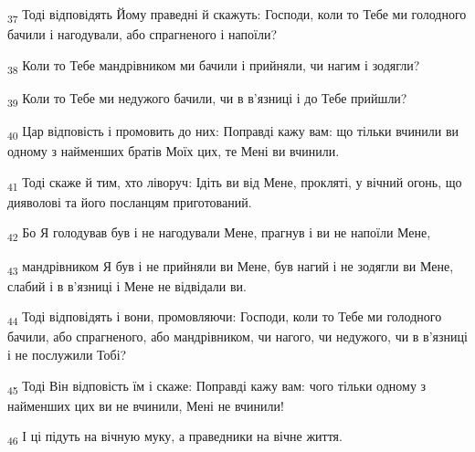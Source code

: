 \begin{tcolorbox}
\textsubscript{37} Тоді відповідять Йому праведні й скажуть: Господи, коли то Тебе ми голодного бачили і нагодували, або спрагненого і напоїли?
\end{tcolorbox}
\begin{tcolorbox}
\textsubscript{38} Коли то Тебе мандрівником ми бачили і прийняли, чи нагим і зодягли?
\end{tcolorbox}
\begin{tcolorbox}
\textsubscript{39} Коли то Тебе ми недужого бачили, чи в в'язниці і до Тебе прийшли?
\end{tcolorbox}
\begin{tcolorbox}
\textsubscript{40} Цар відповість і промовить до них: Поправді кажу вам: що тільки вчинили ви одному з найменших братів Моїх цих, те Мені ви вчинили.
\end{tcolorbox}
\begin{tcolorbox}
\textsubscript{41} Тоді скаже й тим, хто ліворуч: Ідіть ви від Мене, прокляті, у вічний огонь, що дияволові та його посланцям приготований.
\end{tcolorbox}
\begin{tcolorbox}
\textsubscript{42} Бо Я голодував був і не нагодували Мене, прагнув і ви не напоїли Мене,
\end{tcolorbox}
\begin{tcolorbox}
\textsubscript{43} мандрівником Я був і не прийняли ви Мене, був нагий і не зодягли ви Мене, слабий і в в'язниці і Мене не відвідали ви.
\end{tcolorbox}
\begin{tcolorbox}
\textsubscript{44} Тоді відповідять і вони, промовляючи: Господи, коли то Тебе ми голодного бачили, або спрагненого, або мандрівником, чи нагого, чи недужого, чи в в'язниці і не послужили Тобі?
\end{tcolorbox}
\begin{tcolorbox}
\textsubscript{45} Тоді Він відповість їм і скаже: Поправді кажу вам: чого тільки одному з найменших цих ви не вчинили, Мені не вчинили!
\end{tcolorbox}
\begin{tcolorbox}
\textsubscript{46} І ці підуть на вічную муку, а праведники на вічне життя.
\end{tcolorbox}
